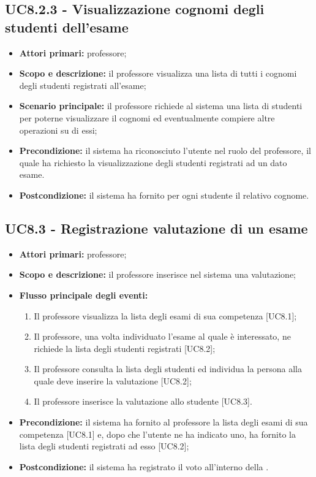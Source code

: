 \documentclass[AnalisiDeiRequisiti.tex]{subfiles}
\begin{document}
\subsection{UC8.2.3 - Visualizzazione cognomi degli studenti dell'esame}
\begin{itemize}
	\item \textbf{Attori primari:} professore;
	\item \textbf{Scopo e descrizione:} il professore visualizza una lista di tutti i cognomi degli studenti registrati all'esame;
	\item \textbf{Scenario principale:} il professore richiede al sistema una lista di studenti per poterne visualizzare il cognomi ed eventualmente compiere altre operazioni su di essi;
	\item \textbf{Precondizione:} il sistema ha riconosciuto l'utente nel ruolo del professore, il quale ha richiesto la visualizzazione degli studenti registrati ad un dato esame.
	\item \textbf{Postcondizione:} il sistema ha fornito per ogni studente il relativo cognome.
\end{itemize}

\subsection{UC8.3 - Registrazione valutazione di un esame}
\begin{itemize}
	\item \textbf{Attori primari:} professore;
	\item \textbf{Scopo e descrizione:} il professore inserisce nel sistema una valutazione;
	\item \textbf{Flusso principale degli eventi:}
	\begin{enumerate}
		\item Il professore visualizza la lista degli esami di sua competenza [UC8.1];
		\item Il professore, una volta individuato l'esame al quale è interessato, ne richiede la lista degli studenti registrati [UC8.2];
		\item Il professore consulta la lista degli studenti ed individua la persona alla quale deve inserire la valutazione [UC8.2];
		\item Il professore inserisce la valutazione allo studente [UC8.3].
	\end{enumerate}
	\item \textbf{Precondizione:} il sistema ha fornito al professore la lista degli esami di sua competenza [UC8.1] e, dopo che l'utente ne ha indicato uno, ha fornito la lista degli studenti registrati ad esso [UC8.2];
	\item \textbf{Postcondizione:} il sistema ha registrato il voto all'interno della .
\end{itemize}
\end{document}
